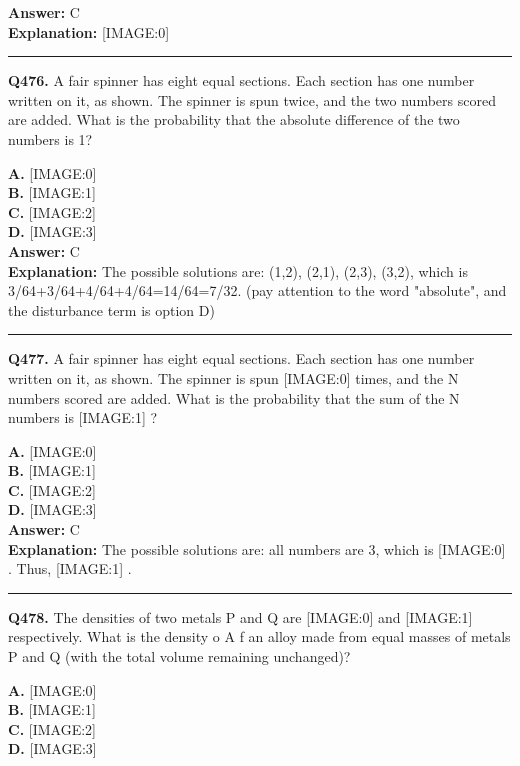 \documentclass[12pt]{article}
\begin{document}
\textbf{Answer:} C \\
\textbf{Explanation:} [IMAGE:0]

\hrule
\vspace{1em}


\noindent
\textbf{Q476.} A fair spinner has eight equal sections. Each section has one number written on it, as shown.
The spinner is spun twice, and the two numbers scored are added. What is the probability that the absolute difference of the two numbers is 1?



\textbf{A.} [IMAGE:0] \\
\textbf{B.} [IMAGE:1] \\
\textbf{C.} [IMAGE:2] \\
\textbf{D.} [IMAGE:3] \\

\textbf{Answer:} C \\
\textbf{Explanation:} The possible solutions are: (1,2), (2,1), (2,3), (3,2), which is 3/64+3/64+4/64+4/64=14/64=7/32.
(pay attention to the word "absolute", and the disturbance term is option D)

\hrule
\vspace{1em}


\noindent
\textbf{Q477.} A fair spinner has eight equal sections. Each section has one number written on it, as shown.
The spinner is spun
[IMAGE:0]
times, and the N numbers scored are added. What is the probability that the sum of the N numbers is
[IMAGE:1]
?



\textbf{A.} [IMAGE:0] \\
\textbf{B.} [IMAGE:1] \\
\textbf{C.} [IMAGE:2] \\
\textbf{D.} [IMAGE:3] \\

\textbf{Answer:} C \\
\textbf{Explanation:} The possible solutions are: all numbers are 3, which is
[IMAGE:0]
.
Thus,
[IMAGE:1]
.

\hrule
\vspace{1em}


\noindent
\textbf{Q478.} The densities of two metals P and Q are
[IMAGE:0]
and
[IMAGE:1]
respectively. What is the density o
A
f an alloy made from equal masses of metals P and Q (with the total volume remaining unchanged)?



\textbf{A.} [IMAGE:0] \\
\textbf{B.} [IMAGE:1] \\
\textbf{C.} [IMAGE:2] \\
\textbf{D.} [IMAGE:3] \\
\end{document}
